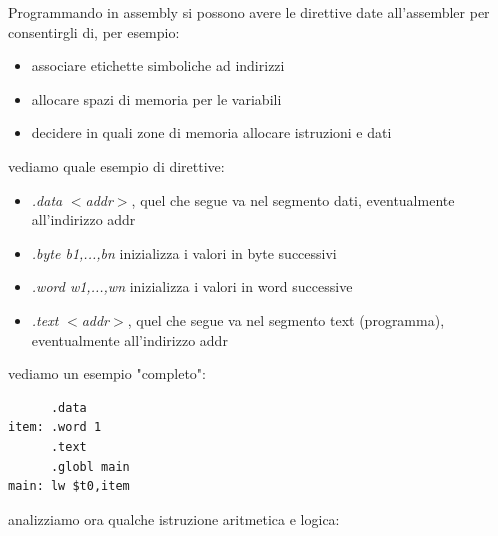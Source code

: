 \documentclass[a4paper,12pt, oneside]{book}
\begin{document}
\newpage
Programmando in assembly si possono avere le direttive date all'assembler per consentirgli di, per esempio:
\begin{itemize}
	\item associare etichette simboliche ad indirizzi
	\item allocare spazi di memoria per le variabili
	\item decidere in quali zone di memoria allocare istruzioni e dati
\end{itemize}
vediamo quale esempio di direttive:
\begin{itemize}
	\item \textit{.data} $<$\textit{addr}$>$, quel che segue va nel segmento dati, eventualmente all'indirizzo addr
	\item \textit{.byte b1,...,bn} inizializza i valori in byte successivi
	\item \textit{.word w1,...,wn} inizializza i valori in word successive
	\item \textit{.text} $<$\textit{addr}$>$, quel che segue va nel segmento text (programma), eventualmente all'indirizzo addr
\end{itemize}
vediamo un esempio "completo":
\begin{verbatim}
      .data
item: .word 1
      .text
      .globl main
main: lw $t0,item
\end{verbatim}
analizziamo ora qualche istruzione aritmetica e logica:
\end{document}
